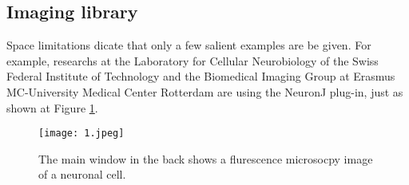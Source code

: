 \documentclass[a4paper]{article}
\begin{document}
\begin{multicols}{2}
\section{Imaging library}
Space limitations dicate that only a few salient examples are be given. For example, researchs at the Laboratory for Cellular Neurobiology of the Swiss Federal Institute of Technology and the Biomedical Imaging Group at Erasmus MC-University Medical Center Rotterdam are using the NeuronJ plug-in, just as shown at Figure \ref{fig1}.
\end{multicols}
\begin{figure}[htbp]
\centering
\texttt{[image: 1.jpeg]}
\caption{The main window in the back shows a flurescence microsocpy image of a neuronal cell.}
\label{fig1}
\end{figure}

\end{document}

